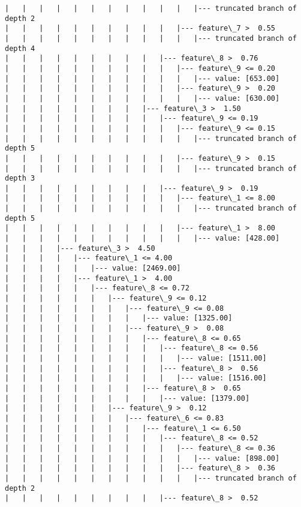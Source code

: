 \documentclass[11pt]{article}
\begin{document}
\begin{Verbatim}[commandchars=\\\{\}]
|   |   |   |   |   |   |   |   |   |   |   |--- truncated branch of depth 2
|   |   |   |   |   |   |   |   |   |   |--- feature\_7 >  0.55
|   |   |   |   |   |   |   |   |   |   |   |--- truncated branch of depth 4
|   |   |   |   |   |   |   |   |   |--- feature\_8 >  0.76
|   |   |   |   |   |   |   |   |   |   |--- feature\_9 <= 0.20
|   |   |   |   |   |   |   |   |   |   |   |--- value: [653.00]
|   |   |   |   |   |   |   |   |   |   |--- feature\_9 >  0.20
|   |   |   |   |   |   |   |   |   |   |   |--- value: [630.00]
|   |   |   |   |   |   |   |   |--- feature\_3 >  1.50
|   |   |   |   |   |   |   |   |   |--- feature\_9 <= 0.19
|   |   |   |   |   |   |   |   |   |   |--- feature\_9 <= 0.15
|   |   |   |   |   |   |   |   |   |   |   |--- truncated branch of depth 5
|   |   |   |   |   |   |   |   |   |   |--- feature\_9 >  0.15
|   |   |   |   |   |   |   |   |   |   |   |--- truncated branch of depth 3
|   |   |   |   |   |   |   |   |   |--- feature\_9 >  0.19
|   |   |   |   |   |   |   |   |   |   |--- feature\_1 <= 8.00
|   |   |   |   |   |   |   |   |   |   |   |--- truncated branch of depth 5
|   |   |   |   |   |   |   |   |   |   |--- feature\_1 >  8.00
|   |   |   |   |   |   |   |   |   |   |   |--- value: [428.00]
|   |   |   |--- feature\_3 >  4.50
|   |   |   |   |--- feature\_1 <= 4.00
|   |   |   |   |   |--- value: [2469.00]
|   |   |   |   |--- feature\_1 >  4.00
|   |   |   |   |   |--- feature\_8 <= 0.72
|   |   |   |   |   |   |--- feature\_9 <= 0.12
|   |   |   |   |   |   |   |--- feature\_9 <= 0.08
|   |   |   |   |   |   |   |   |--- value: [1325.00]
|   |   |   |   |   |   |   |--- feature\_9 >  0.08
|   |   |   |   |   |   |   |   |--- feature\_8 <= 0.65
|   |   |   |   |   |   |   |   |   |--- feature\_8 <= 0.56
|   |   |   |   |   |   |   |   |   |   |--- value: [1511.00]
|   |   |   |   |   |   |   |   |   |--- feature\_8 >  0.56
|   |   |   |   |   |   |   |   |   |   |--- value: [1516.00]
|   |   |   |   |   |   |   |   |--- feature\_8 >  0.65
|   |   |   |   |   |   |   |   |   |--- value: [1379.00]
|   |   |   |   |   |   |--- feature\_9 >  0.12
|   |   |   |   |   |   |   |--- feature\_6 <= 0.83
|   |   |   |   |   |   |   |   |--- feature\_1 <= 6.50
|   |   |   |   |   |   |   |   |   |--- feature\_8 <= 0.52
|   |   |   |   |   |   |   |   |   |   |--- feature\_8 <= 0.36
|   |   |   |   |   |   |   |   |   |   |   |--- value: [898.00]
|   |   |   |   |   |   |   |   |   |   |--- feature\_8 >  0.36
|   |   |   |   |   |   |   |   |   |   |   |--- truncated branch of depth 2
|   |   |   |   |   |   |   |   |   |--- feature\_8 >  0.52

\end{Verbatim}
\end{document}
